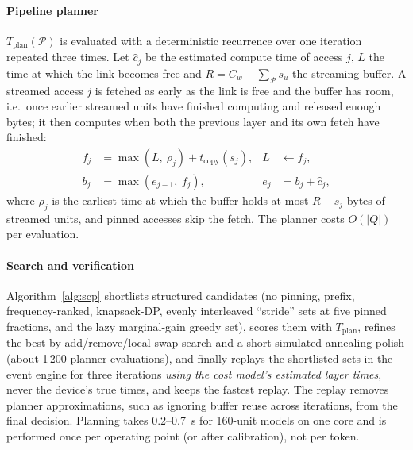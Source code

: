 \documentclass[preprint,12pt]{elsarticle}
\begin{document}
\paragraph{Pipeline planner}
$T_{\mathrm{plan}}(\mathcal P)$ is evaluated with a deterministic recurrence over one iteration repeated three times. Let $\hat c_j$ be the estimated compute time of access $j$, $L$ the time at which the link becomes free and $R=C_w-\sum_{\mathcal P}s_u$ the streaming buffer. A streamed access $j$ is fetched as early as the link is free and the buffer has room, i.e.\ once earlier streamed units have finished computing and released enough bytes; it then computes when both the previous layer and its own fetch have finished:
\begin{align}
f_j &= \max(L,\ \rho_j) + t_{\mathrm{copy}}(s_j), & L &\leftarrow f_j,\\
b_j &= \max(e_{j-1},\ f_j), & e_j &= b_j + \hat c_j ,
\end{align}
where $\rho_j$ is the earliest time at which the buffer holds at most $R-s_j$ bytes of streamed units, and pinned accesses skip the fetch. The planner costs $O(|Q|)$ per evaluation.

\paragraph{Search and verification}
Algorithm~\ref{alg:scp} shortlists structured candidates (no pinning, prefix, frequency-ranked, knapsack-DP, evenly interleaved ``stride'' sets at five pinned fractions, and the lazy marginal-gain greedy set), scores them with $T_{\mathrm{plan}}$, refines the best by add/remove/local-swap search and a short simulated-annealing polish (about 1\,200 planner evaluations), and finally replays the shortlisted sets in the event engine for three iterations \emph{using the cost model's estimated layer times}, never the device's true times, and keeps the fastest replay. The replay removes planner approximations, such as ignoring buffer reuse across iterations, from the final decision. Planning takes 0.2--0.7~s for 160-unit models on one core and is performed once per operating point (or after calibration), not per token.
\end{document}
